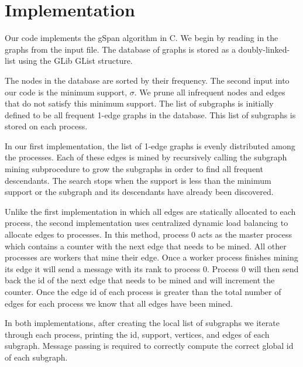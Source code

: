 \section{Implementation}
\label{sec:implementation}

Our code implements the gSpan algorithm in C. We begin by reading in
the graphs from the input file. The database of graphs is
stored as a doubly-linked-list using the GLib GList structure.

The nodes in the database are sorted by their frequency. The second input
into our code is the minimum support, $\sigma$. We prune all infrequent nodes
and edges that do not satisfy this minimum support. The list of subgraphs is
initially defined to be all frequent 1-edge graphs in the database.  This list
of subgraphs is stored on each process.

In our first implementation, the list of 1-edge graphs is evenly distributed
among the processes. Each of these edges is mined by recursively calling the
subgraph mining subprocedure to grow the subgraphs in order to find all
frequent descendants.
The search stops when the support is less than the
minimum support or the subgraph and its descendants have already been
discovered.

Unlike the first implementation in which all edges are statically allocated
to each process, the second implementation uses centralized dynamic
load balancing to allocate edges to processes.
In this method, process 0 acts as the master
process which contains a counter with the next edge that needs to be mined.
All other processes are workers that mine their edge. Once a worker process
finishes mining its edge it will send a message with its rank to process 0.
Process 0 will then send back the id of the next edge that needs to be mined
and will increment the counter. Once the edge id of each process is greater
than the total number of edges for each process we know that all edges
have been mined. 

In both implementations, after creating the local list of subgraphs we
iterate through each process, printing the id, support, vertices, and
edges of each subgraph.
Message passing is required to correctly compute the correct global 
id of each subgraph.
